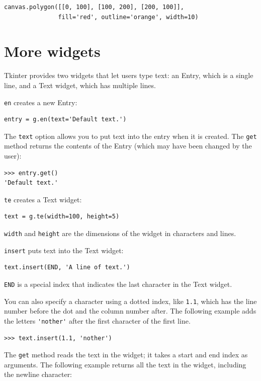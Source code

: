\documentclass[10pt]{book}
\begin{document}
\begin{CJK}{UTF8}{gbsn}
\begin{verbatim}
canvas.polygon([[0, 100], [100, 200], [200, 100]],
               fill='red', outline='orange', width=10)
\end{verbatim}
%


\section{More widgets}

Tkinter provides two widgets that let users type text: an
Entry, which is a single line, and a Text widget, which has
multiple lines.

{\tt en} creates a new Entry:

\begin{verbatim}
entry = g.en(text='Default text.')
\end{verbatim}
%
The {\tt text} option allows you to put text into the entry
when it is created.  The {\tt get} method returns the contents
of the Entry (which may have been changed by the user):

\begin{verbatim}
>>> entry.get()
'Default text.'
\end{verbatim}
%
{\tt te} creates a Text widget:

\begin{verbatim}
text = g.te(width=100, height=5)
\end{verbatim}
%
{\tt width} and {\tt height} are the dimensions of the
widget in characters and lines.

{\tt insert} puts text into the Text widget:

\begin{verbatim}
text.insert(END, 'A line of text.')
\end{verbatim}
%
{\tt END} is a special index that indicates the last character in the
Text widget.

You can also specify a character using a dotted index, like {\tt 1.1},
which has the line number before the dot and the column number after.
The following example adds the letters \verb"'nother'" after the first
character of the first line.

\begin{verbatim}
>>> text.insert(1.1, 'nother')
\end{verbatim}
%
The {\tt get} method reads the text in the widget; it takes a start
and end index as arguments.  The following example returns all the
text in the widget, including the newline character:


\end{CJK}
\end{document}
